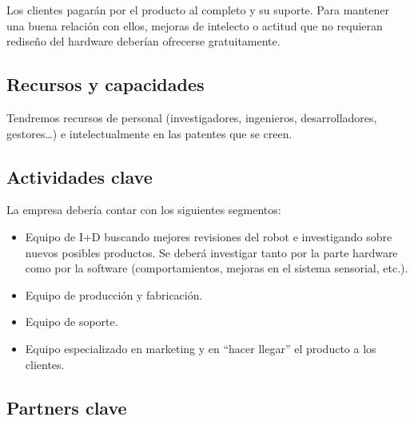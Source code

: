 
Los clientes pagarán por el producto al completo y su suporte. Para mantener una buena relación con ellos, mejoras de intelecto o actitud que no requieran rediseño del hardware deberían ofrecerse gratuitamente.

\subsection{Recursos y capacidades}


Tendremos recursos de personal (investigadores, ingenieros, desarrolladores, gestores\dots) e intelectualmente en las patentes que se creen.

\subsection{Actividades clave}


La empresa debería contar con los siguientes segmentos:
\begin{itemize}
    \item Equipo de I+D buscando mejores revisiones del robot e investigando sobre nuevos posibles productos. Se deberá investigar tanto por la parte hardware como por la software (comportamientos, mejoras en el sistema sensorial, etc.).
    \item Equipo de producción y fabricación.
    \item Equipo de soporte.
    \item Equipo especializado en marketing y en ``hacer llegar'' el producto a los clientes.
\end{itemize}

\subsection{Partners clave}

